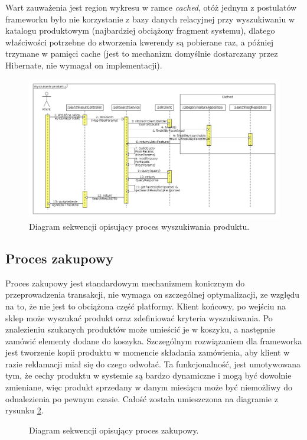 Wart zauważenia jest region wykresu w ramce \textit{cached}, otóż jednym z postulatów frameworku było nie korzystanie z bazy danych relacyjnej przy wyszukiwaniu w katalogu produktowym (najbardziej obciążony fragment systemu), dlatego właściwości potrzebne do stworzenia kwerendy są pobierane raz, a później trzymane w pamięci cache (jest to mechanizm domyślnie dostarczany przez Hibernate, nie wymagał on implementacji). 
  \begin{figure}
	\begin{center}
		\includegraphics[scale=0.4]{wyszukanieProdSekw.png}
	\end{center}
	\caption{{\color{black}Diagram sekwencji opisujący proces wyszukiwania produktu.}} \label{wyszukiwanieProdSekw}
\end{figure}



\subsection{Proces zakupowy}
Proces zakupowy jest standardowym mechanizmem konicznym do przeprowadzenia transakcji, nie wymaga on szczególnej optymalizacji, ze względu na to, że nie jest to obciążona część platformy. Klient końcowy, po wejściu na sklep może wyszukać produkt oraz zdefiniować kryteria wyszukiwania. Po znalezieniu szukanych produktów może umieścić je w koszyku, a następnie zamówić elementy dodane do koszyka. Szczególnym rozwiązaniem dla frameworka jest tworzenie kopii produktu w momencie składania zamówienia, aby klient w razie reklamacji miał się do czego odwołać. Ta funkcjonalność, jest umotywowana tym, że cechy produktu w systemie są bardzo dynamiczne i mogą być dowolnie zmieniane, więc produkt sprzedany w danym miesiącu może być niemożliwy do odnalezienia po pewnym czasie. Całość została umieszczona na diagramie z rysunku \ref{procZakup}.
\begin{figure}
	\begin{center}
	\end{center}
	\caption{{\color{black}Diagram sekwencji opisujący proces zakupowy.}} \label{procZakup}
\end{figure}


